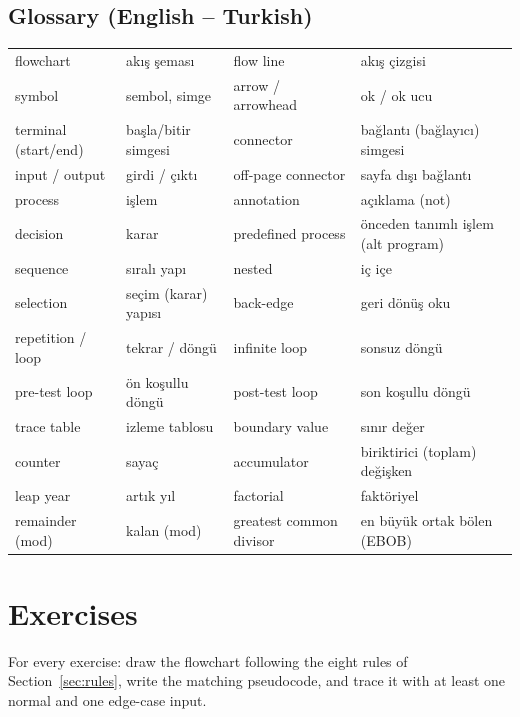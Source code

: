 \documentclass[11pt,a4paper]{article}
\begin{document}
\subsection*{Glossary (English -- Turkish)}
\begin{center}\small
\begin{tabularx}{\linewidth}{>{\raggedright\arraybackslash}p{30mm}L>{\raggedright\arraybackslash}p{30mm}L}
\toprule
flowchart & akış şeması & flow line & akış çizgisi\\
symbol & sembol, simge & arrow / arrowhead & ok / ok ucu\\
terminal (start/end) & başla/bitir simgesi & connector & bağlantı (bağlayıcı) simgesi\\
input / output & girdi / çıktı & off-page connector & sayfa dışı bağlantı\\
process & işlem & annotation & açıklama (not)\\
decision & karar & predefined process & önceden tanımlı işlem (alt program)\\
sequence & sıralı yapı & nested & iç içe\\
selection & seçim (karar) yapısı & back-edge & geri dönüş oku\\
repetition / loop & tekrar / döngü & infinite loop & sonsuz döngü\\
pre-test loop & ön koşullu döngü & post-test loop & son koşullu döngü\\
trace table & izleme tablosu & boundary value & sınır değer\\
counter & sayaç & accumulator & biriktirici (toplam) değişken\\
leap year & artık yıl & factorial & faktöriyel\\
remainder (mod) & kalan (mod) & greatest common divisor & en büyük ortak bölen (EBOB)\\ \bottomrule
\end{tabularx}
\end{center}

\section{Exercises}\label{sec:exercises}
For every exercise: draw the flowchart following the eight rules of Section~\ref{sec:rules}, write the matching pseudocode, and trace it with at least one normal and one edge-case input.
\end{document}
